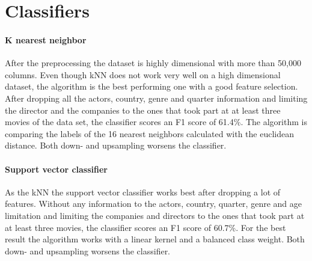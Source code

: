 \section {Classifiers}
\paragraph{K nearest neighbor}
After the preprocessing the dataset is highly dimensional with more than 50,000 columns. Even though kNN does not work very well on a high dimensional dataset, the algorithm is the best performing one with a good feature selection. After dropping all the actors, country, genre and quarter information and limiting the director and the companies to the ones that took part at at least three movies of the data set, the classifier scores an F1 score of 61.4\%. The algorithm is comparing the labels of the 16 nearest neighbors calculated with the euclidean distance. Both down- and upsampling worsens the classifier. 

\paragraph{Support vector classifier}
As the kNN the support vector classifier works best after dropping a lot of features. Without any information to the actors, country, quarter, genre and age limitation and limiting the companies and directors to the ones that took part at at least three movies, the classifier scores an F1 score of 60.7\%. For the best result the algorithm works with a linear kernel and a balanced class weight. Both down- and upsampling worsens the classifier.


